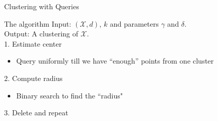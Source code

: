 \documentclass{beamer}
\newcommand{\mc}{\mathcal}
\begin{document}
\begin{frame}{Clustering with Queries}
  \begin{block}{The algorithm}
	\vspace{0.2cm}Input: $(\mc X, d)$, $k$ and parameters $\gamma$ and $\delta$.\\
    \vspace{0.2cm}Output: A clustering of $\mc X$.\\
	\vspace{0.4cm}
	1. Estimate center\\
	\begin{itemize}
		\item Query uniformly till we have ``enough'' points from one cluster
    \end{itemize}  
	\vspace{0.4cm}
	2. Compute radius\\
	\begin{itemize}
	  \vspace{0.2cm}
	  \item Binary search to find the ``radius"
    \end{itemize}  
	\vspace{0.4cm}
	3. Delete and repeat
  \end{block}
\end{frame}
\end{document}
